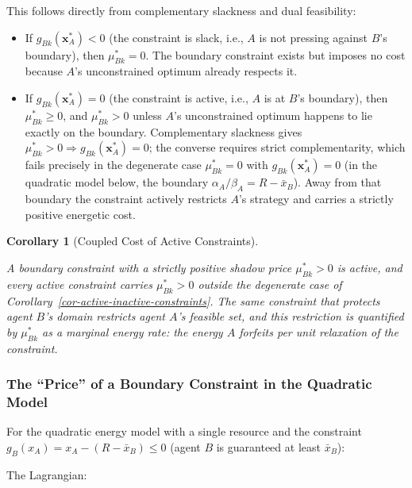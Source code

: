 \documentclass[11pt]{article}
\theoremstyle{plain}
\newtheorem{corollary}[theorem]{Corollary}
\theoremstyle{definition}
\theoremstyle{remark}
\let\origsubsubsection\subsubsection
\renewcommand{\subsubsection}{\needspace{4\baselineskip}\origsubsubsection}
\providecommand{\tightlist}{%
  \setlength{\itemsep}{0pt}\setlength{\parskip}{0pt}}
\begin{document}
This follows directly from complementary slackness and dual feasibility:

\begin{itemize}
\tightlist
\item
  If \(g_{Bk}(\mathbf{x}_A^*) < 0\) (the constraint is slack, i.e.,
  \(A\) is not pressing against \(B\)'s boundary), then
  \(\mu_{Bk}^* = 0\). The boundary constraint exists but imposes no cost
  because \(A\)'s unconstrained optimum already respects it.
\item
  If \(g_{Bk}(\mathbf{x}_A^*) = 0\) (the constraint is active, i.e.,
  \(A\) is at \(B\)'s boundary), then \(\mu_{Bk}^* \geq 0\), and
  \(\mu_{Bk}^* > 0\) unless \(A\)'s unconstrained optimum happens to lie
  exactly on the boundary. Complementary slackness gives
  \(\mu_{Bk}^* > 0 \Rightarrow g_{Bk}(\mathbf{x}_A^*) = 0\); the
  converse requires strict complementarity, which fails precisely in the
  degenerate case \(\mu_{Bk}^* = 0\) with \(g_{Bk}(\mathbf{x}_A^*) = 0\)
  (in the quadratic model below, the boundary
  \(\alpha_A / \beta_A = R - \bar{x}_B\)). Away from that boundary the
  constraint actively restricts \(A\)'s strategy and carries a strictly
  positive energetic cost.
\end{itemize}

\begin{corollary}[Coupled Cost of Active Constraints]
\label{cor-newtons-third-law}

A boundary constraint with a strictly positive shadow price $\mu_{Bk}^* > 0$ is active, and every active constraint carries $\mu_{Bk}^* > 0$ outside the degenerate case of Corollary~\ref{cor-active-inactive-constraints}. The same constraint that protects agent $B$'s domain restricts agent $A$'s feasible set, and this restriction is quantified by $\mu_{Bk}^*$ as a marginal energy rate: the energy $A$ forfeits per unit relaxation of the constraint.
\end{corollary}

\subsubsection{The ``Price'' of a Boundary Constraint in the Quadratic
Model}\label{the-price-of-a-boundary-constraint-in-the-quadratic-model}

For the quadratic energy model with a single resource and the constraint
\(g_B(x_A) = x_A - (R - \bar{x}_B) \leq 0\) (agent \(B\) is guaranteed
at least \(\bar{x}_B\)):

The Lagrangian:
\end{document}
